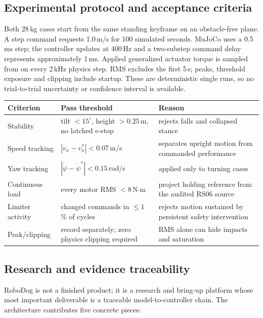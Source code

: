 \documentclass[11pt,a4paper]{article}
\begin{document}
\subsection{Experimental protocol and acceptance criteria}

Both 28\,kg cases start from the same standing keyframe on an obstacle-free
plane. A step command requests 1.0\,m/s for 100 simulated seconds. MuJoCo uses
a 0.5\,ms step; the controller updates at 400\,Hz and a two-substep command
delay represents approximately 1\,ms. Applied generalized actuator torque is
sampled from  on every 2\,kHz physics step. RMS excludes
the first 5\,s; peaks, threshold exposure and clipping include startup. These
are deterministic single runs, so no trial-to-trial uncertainty or confidence
interval is available.

\begin{center}\small
\begin{tabular}{@{}lp{}p{}@{}}
\toprule
\textbf{Criterion} & \textbf{Pass threshold} & \textbf{Reason} \\
\midrule
Stability & tilt $<15^\circ$, height $>0.25$\,m, no latched e-stop & rejects falls and collapsed stance \\
Speed tracking & $|v_x-v_x^*|<0.07$\,m/s & separates upright motion from commanded performance \\
Yaw tracking & $|\dot\psi-\dot\psi^*|<0.15$\,rad/s & applied only to turning cases \\
Continuous load & every motor RMS $<8$\,N$\cdot$m & project holding reference from the audited RS06 source \\
Limiter activity & changed commands in $\le1$\,\% of cycles & rejects motion sustained by persistent safety intervention \\
Peak/clipping & record separately; zero physics clipping required & RMS alone can hide impacts and saturation \\
\bottomrule
\end{tabular}
\end{center}

\subsection{Research and evidence traceability}
\label{sec:research-basis}

RoboDog is not a finished product; it is a research and bring-up platform whose
most important deliverable is a traceable model-to-controller chain. The
architecture contributes five concrete pieces:
\end{document}
